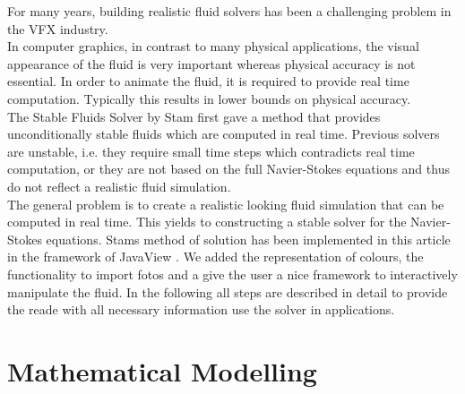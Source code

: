 \documentclass[a4paper,10pt,oneside,final,german,openbib,pdftex,titlepage]{scrbook}
\begin{document}
\nopagebreak
For many years, building realistic fluid solvers has been a challenging problem in the VFX industry.\\
In computer graphics, in contrast to many physical applications, the visual appearance of the fluid is very important whereas physical accuracy is not essential. In order to animate the fluid, it is required to provide real time computation. Typically this results in lower bounds on physical accuracy.\\

The Stable Fluids Solver by Stam \cite{Stam} first gave a method that provides unconditionally stable fluids which are computed in real time. Previous solvers are unstable, i.e. they require small time steps which contradicts real time computation, or they are not based on the full Navier-Stokes equations and thus do not reflect a realistic fluid simulation.\\

The general problem is to create a realistic looking fluid simulation that can be computed in real time. This yields to constructing a stable solver for the Navier-Stokes equations. Stams method of solution has been implemented in this article in the framework of JavaView \cite{JavaView}. We added the representation of colours, the functionality to import fotos and a give the user a nice framework to interactively manipulate the fluid. In the following all steps are described in detail to provide the reade with all necessary information use the solver in applications.\\
 
\chapter{Mathematical Modelling} \label{Section:Mathematical Modelling} \label{chapter:Math}
\end{document}
